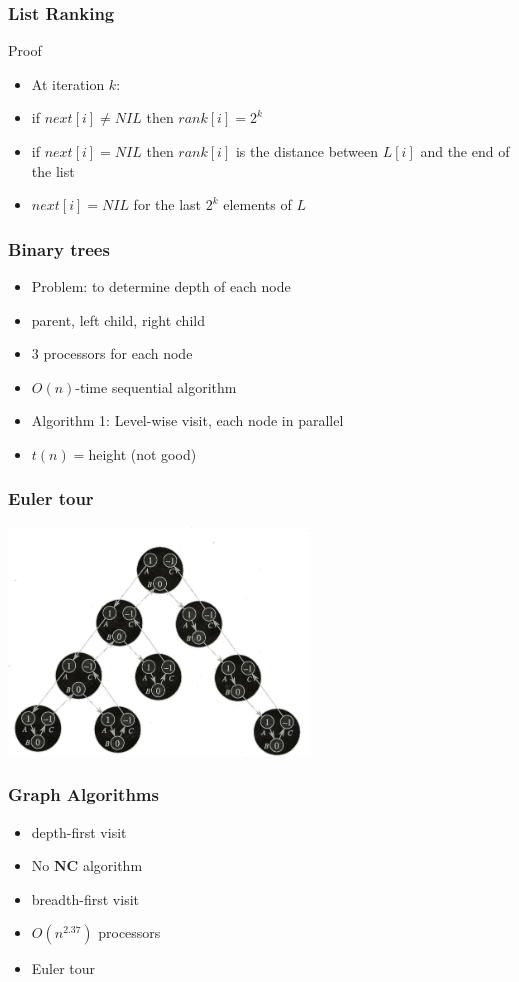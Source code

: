 \documentclass[12pt,aspectratio=169]{beamer}
\begin{document}
\begin{frame}\frametitle{List Ranking}
\begin{block}{Proof}
  \begin{itemize}
  \item
    At iteration $k$:
  \item
    if $next[i] \neq NIL$ then $rank[i] = 2^{k}$
  \item
    if $next[i] = NIL$ then $rank[i]$ is the distance between $L[i]$ and the end of the
    list
  \item
    $next[i] = NIL$ for the last $2^{k}$ elements of $L$
  \end{itemize}
\end{block}
\end{frame}
\begin{frame}\frametitle{Binary trees}
  \begin{itemize}
  \item
    Problem: to determine depth of each node
  \item
    parent, left child, right child
  \item
    $3$ processors for each node
  \item
    $O(n)$-time sequential algorithm
  \item
    Algorithm 1: Level-wise visit, each node in parallel
  \item
    $t(n)=$height (not good)
  \end{itemize}
\end{frame}


\begin{frame}\frametitle{Euler tour}
  \begin{center}
    \includegraphics[width=8cm]{img/euler1}
  \end{center}

\end{frame}

\begin{frame}\frametitle{Graph Algorithms}
  \begin{itemize}
  \item
    depth-first visit
  \item
    No $\mathbf{NC}$ algorithm
  \item
    breadth-first visit
  \item
    $O(n^{2.37})$ processors
  \item
    \alert{Euler tour}
  \end{itemize}
\end{frame}
\end{document}
